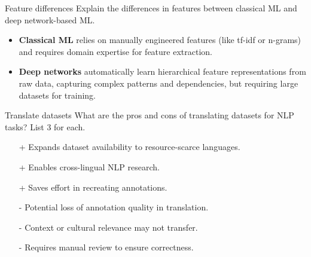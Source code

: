 \documentclass{article}
\begin{document}
\begin{exercise}{Feature differences}
  Explain the differences in features between classical ML and deep network-based ML.

  \begin{solution}
    \begin{itemize}
        \item \textbf{Classical ML} relies on manually engineered features (like tf-idf or n-grams) and requires domain expertise for feature extraction.
        \item \textbf{Deep networks} automatically learn hierarchical feature representations from raw data, capturing complex patterns and dependencies, but requiring large datasets for training.
    \end{itemize}
  \end{solution}
\end{exercise}

\begin{exercise}{Translate datasets}
  What are the pros and cons of translating datasets for NLP tasks? List 3 for each.

  \begin{solution}
    \begin{itemize}
        \item[+] Expands dataset availability to resource-scarce languages.
        \item[+] Enables cross-lingual NLP research.
        \item[+] Saves effort in recreating annotations.
        \item[-] Potential loss of annotation quality in translation.
        \item[-] Context or cultural relevance may not transfer.
        \item[-] Requires manual review to ensure correctness.
    \end{itemize}
  \end{solution}
\end{exercise}
\end{document}
